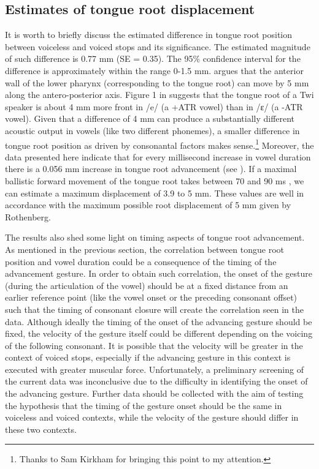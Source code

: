 \documentclass[12pt,]{article}
\let\rmarkdownfootnote\footnote%
\def\footnote{\protect\rmarkdownfootnote}
\begin{document}
\hypertarget{estimates-of-tongue-root-displacement}{%
\subsection{Estimates of tongue root
displacement}\label{estimates-of-tongue-root-displacement}}

It is worth to briefly discuss the estimated difference in tongue root
position between voiceless and voiced stops and its significance. The
estimated magnitude of such difference is 0.77 mm (SE = 0.35). The 95\%
confidence interval for the difference is approximately within the range
0-1.5 mm. \citet{rothenberg1967} argues that the anterior wall of the
lower pharynx (corresponding to the tongue root) can move by 5 mm along
the antero-posterior axis. Figure 1 in \citet{kirkham2017} suggests that
the tongue root of a Twi speaker is about 4 mm more front in /e/ (a +ATR
vowel) than in /ɛ/ (a -ATR vowel). Given that a difference of 4 mm can
produce a substantially different acoustic output in vowels (like two
different phonemes), a smaller difference in tongue root position as
driven by consonantal factors makes
sense.\footnote{Thanks to Sam Kirkham for bringing this point to my attention.}
Moreover, the data presented here indicate that for every millisecond
increase in vowel duration there is a 0.056 mm increase in tongue root
advancement (see ). If a maximal ballistic forward
movement of the tongue root takes between 70 and 90 ms
\citep{rothenberg1967}, we can estimate a maximum displacement of 3.9 to
5 mm. These values are well in accordance with the maximum possible root
displacement of 5 mm given by Rothenberg.

The results also shed some light on timing aspects of tongue root
advancement. As mentioned in the previous section, the correlation
between tongue root position and vowel duration could be a consequence
of the timing of the advancement gesture. In order to obtain such
correlation, the onset of the gesture (during the articulation of the
vowel) should be at a fixed distance from an earlier reference point
(like the vowel onset or the preceding consonant offset) such that the
timing of consonant closure will create the correlation seen in the
data. Although ideally the timing of the onset of the advancing gesture
should be fixed, the velocity of the gesture itself could be different
depending on the voicing of the following consonant. It is possible that
the velocity will be greater in the context of voiced stops, especially
if the advancing gesture in this context is executed with greater
muscular force. Unfortunately, a preliminary screening of the current
data was inconclusive due to the difficulty in identifying the onset of
the advancing gesture. Further data should be collected with the aim of
testing the hypothesis that the timing of the gesture onset should be
the same in voiceless and voiced contexts, while the velocity of the
gesture should differ in these two contexts.
\end{document}
